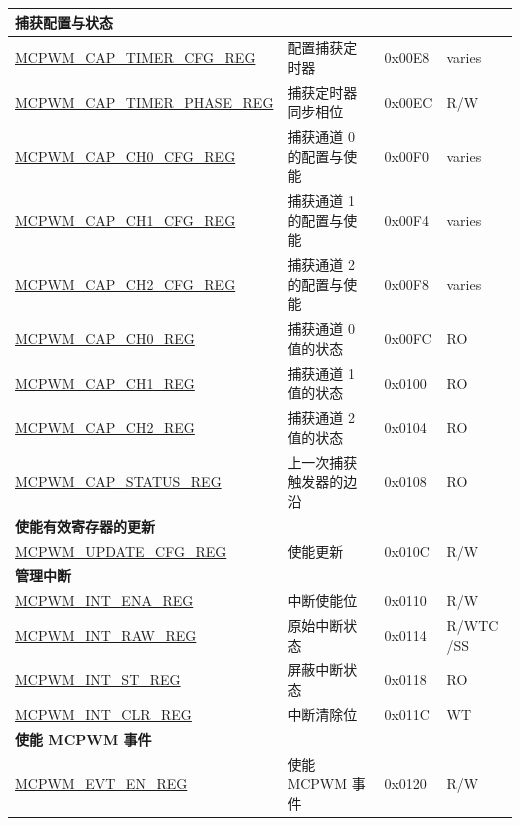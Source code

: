 \begin{longtable}{ | p{6cm} | p{7.2cm} | p{1.2cm} | p{1cm} | }
\multicolumn{4}{|l|}{\textbf{捕获配置与状态}} \\ \hline
\hyperref[regdesc:MCPWMCAPTIMERCFGREG]{MCPWM\_CAP\_TIMER\_CFG\_REG} & 配置捕获定时器 & 0x00E8 & varies \\ \hline
\hyperref[regdesc:MCPWMCAPTIMERPHASEREG]{MCPWM\_CAP\_TIMER\_PHASE\_REG} & 捕获定时器同步相位 & 0x00EC &  R/W \\ \hline
\hyperref[regdesc:MCPWMCAPCH0CFGREG]{MCPWM\_CAP\_CH0\_CFG\_REG} & 捕获通道 0 的配置与使能 & 0x00F0 & varies \\ \hline
\hyperref[regdesc:MCPWMCAPCH1CFGREG]{MCPWM\_CAP\_CH1\_CFG\_REG} & 捕获通道 1 的配置与使能 & 0x00F4 & varies \\ \hline
\hyperref[regdesc:MCPWMCAPCH2CFGREG]{MCPWM\_CAP\_CH2\_CFG\_REG} & 捕获通道 2 的配置与使能 &  0x00F8 & varies\\ \hline
\hyperref[regdesc:MCPWMCAPCH0REG]{MCPWM\_CAP\_CH0\_REG} & 捕获通道 0 值的状态 &0x00FC &  RO \\ \hline
\hyperref[regdesc:MCPWMCAPCH1REG]{MCPWM\_CAP\_CH1\_REG} & 捕获通道 1 值的状态 & 0x0100 & RO \\ \hline
\hyperref[regdesc:MCPWMCAPCH2REG]{MCPWM\_CAP\_CH2\_REG} & 捕获通道 2 值的状态 & 0x0104 & RO \\ \hline
\hyperref[regdesc:MCPWMCAPSTATUSREG]{MCPWM\_CAP\_STATUS\_REG} & 上一次捕获触发器的边沿 & 0x0108 & RO \\ \hline

\multicolumn{4}{|l|}{\textbf{使能有效寄存器的更新}} \\ \hline
\hyperref[regdesc:MCPWMUPDATECFGREG]{MCPWM\_UPDATE\_CFG\_REG} & 使能更新 & 0x010C &  R/W \\ \hline

\multicolumn{4}{|l|}{\textbf{管理中断}} \\ \hline
\hyperref[regdesc:MCPWMINTENAREG]{MCPWM\_INT\_ENA\_REG} & 中断使能位 & 0x0110 & R/W \\ \hline
\hyperref[regdesc:MCPWMINTRAWREG]{MCPWM\_INT\_RAW\_REG} & 原始中断状态 & 0x0114 & R/WTC
/SS\\ \hline
\hyperref[regdesc:MCPWMINTSTREG]{MCPWM\_INT\_ST\_REG} & 屏蔽中断状态 & 0x0118 & RO \\ \hline
\hyperref[regdesc:MCPWMINTCLRREG]{MCPWM\_INT\_CLR\_REG} & 中断清除位 & 0x011C & WT \\ \hline

\multicolumn{4}{|l|}{\textbf{使能 MCPWM 事件}} \\ \hline
\hyperref[regdesc:MCPWMEVTENREG]{MCPWM\_EVT\_EN\_REG} & 使能 MCPWM 事件 & 0x0120 & R/W \\ \hline


\end{longtable}

